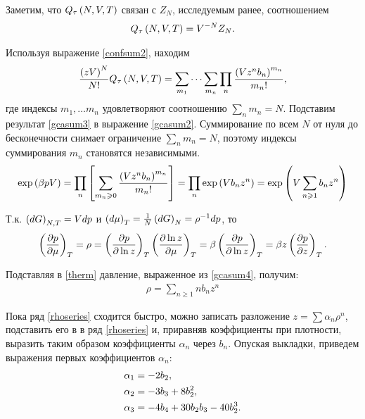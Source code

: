 Заметим, что $Q_\tau \left( N, V, T \right)$ связан с $Z_N$, исследуемым ранее, соотношением
\vverh
\begin{gather}
	Q_\tau \left( N, V, T \right) = V^{-N} Z_N. \notag
\end{gather}

Используя выражение \eqref{confsum2}, находим
\vverh
\begin{gather}
	\frac{ \left( z V \right)^N}{N!} Q_\tau \left( N, V, T \right) = \sum_{m_1} \cdots \sum_{m_n} \prod_n \frac{\left( V z^n b_n \right)^{m_n}}{m_n!}, \label{gcasum3}
\end{gather}
где индексы $m_1, \dots m_n$ удовлетворяют соотношению $\sum_n m_n = N$. Подставим результат \eqref{gcasum3} в выражение \eqref{gcasum2}. Суммирование по всем $N$ от нуля до бесконечности снимает ограничение $\sum_n m_n = N$, поэтому индексы суммирования $m_n$ становятся независимыми.
\vverh
\begin{gather}
	\exp \left( \beta p V \right) = \prod_n \left[ \sum_{m_n \geqslant 0} \frac{ \left( V z^n b_n \right)^{m_n}}{m_n!} \right] = \prod_n \exp \left( V b_n z^n \right) = \exp \left( V \sum_{n \geqslant 1} b_n z^n \right) \label{gcasum4}
\end{gather}

Т.к. $\left( dG \right)_{N, T} = V dp$ и $\left( d \mu \right)_T = \frac{1}{N} \left( d G \right)_N = \rho^{-1} d p$, то
\vverh
\begin{gather}
	\left( \frac{\partial p}{\partial \mu} \right)_T = \rho = \left( \frac{\partial p}{\partial \ln z} \right)_T \left( \frac{\partial \ln z}{\partial \mu} \right)_T = \beta \left( \frac{\partial p}{\partial \ln z} \right)_T = \beta z \left( \frac{\partial p}{\partial z} \right)_T. \label{therm}
\end{gather}

Подставляя в \eqref{therm} давление, выраженное из \eqref{gcasum4}, получим:
\vverh
\begin{gather}
	\rho = \sum_{n \geqslant 1} n b_n z^n \label{rhoseries}
\end{gather}

Пока ряд \eqref{rhoseries} сходится быстро, можно записать разложение $z = \sum \alpha_n \rho^n$, подставить его в в ряд \eqref{rhoseries} и, приравняв коэффициенты при плотности, выразить таким образом коэффициенты $\alpha_n$ через $b_n$. Опуская выкладки, приведем выражения первых коэффициентов $\alpha_n$:
\vverh
\begin{gather}
	\begin{aligned}
		\alpha_1 &= - 2 b_2 , \\
		\alpha_2 &= - 3 b_3 + 8 b_2^2, \\
		\alpha_3 &= - 4 b_4 + 30 b_2 b_3 - 40 b_2^3.
	\end{aligned} \notag
\end{gather}

